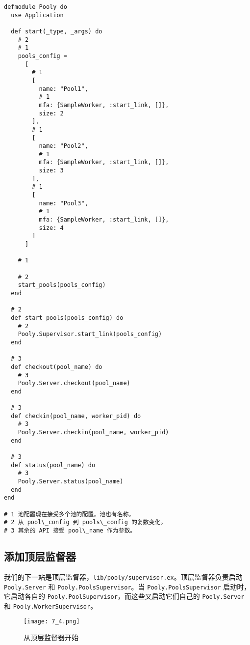 \begin{code}{}
\begin{verbatim}
defmodule Pooly do
  use Application

  def start(_type, _args) do
    # 2
    # 1
    pools_config =
      [
        # 1
        [
          name: "Pool1",
          # 1
          mfa: {SampleWorker, :start_link, []},
          size: 2
        ],
        # 1
        [
          name: "Pool2",
          # 1
          mfa: {SampleWorker, :start_link, []},
          size: 3
        ],
        # 1
        [
          name: "Pool3",
          # 1
          mfa: {SampleWorker, :start_link, []},
          size: 4
        ]
      ]

    # 1

    # 2
    start_pools(pools_config)
  end

  # 2
  def start_pools(pools_config) do
    # 2
    Pooly.Supervisor.start_link(pools_config)
  end

  # 3
  def checkout(pool_name) do
    # 3
    Pooly.Server.checkout(pool_name)
  end

  # 3
  def checkin(pool_name, worker_pid) do
    # 3
    Pooly.Server.checkin(pool_name, worker_pid)
  end

  # 3
  def status(pool_name) do
    # 3
    Pooly.Server.status(pool_name)
  end
end

# 1 池配置现在接受多个池的配置。池也有名称。
# 2 从 pool\_config 到 pools\_config 的复数变化。
# 3 其余的 API 接受 pool\_name 作为参数。
\end{verbatim}
\end{code}




\subsection{添加顶层监督器}

我们的下一站是顶层监督器，\texttt{lib/pooly/supervisor.ex}。顶层监督器负责启动
\texttt{Pooly.Server} 和
\texttt{Pooly.PoolsSupervisor}。当
\texttt{Pooly.PoolsSupervisor} 启动时，它启动各自的
\texttt{Pooly.PoolSupervisor}，而这些又启动它们自己的
\texttt{Pooly.Server} 和
\texttt{Pooly.WorkerSupervisor}。


\begin{figure}[!ht]
    \centering
    \texttt{[image: 7\_4.png]}
    \caption{从顶层监督器开始}
    \label{fig:7_4}
\end{figure}


